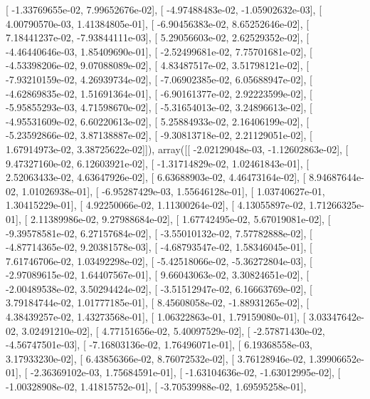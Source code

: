 \documentclass{article}
\begin{document}
       [ -1.33769655e-02,   7.99652676e-02],
       [ -4.97488483e-02,  -1.05902632e-03],
       [  4.00790570e-03,   1.41384805e-01],
       [ -6.90456383e-02,   8.65252646e-02],
       [  7.18441237e-02,  -7.93844111e-03],
       [  5.29056603e-02,   2.62529352e-02],
       [ -4.46440646e-03,   1.85409690e-01],
       [ -2.52499681e-02,   7.75701681e-02],
       [ -4.53398206e-02,   9.07088089e-02],
       [  4.83487517e-02,   3.51798121e-02],
       [ -7.93210159e-02,   4.26939734e-02],
       [ -7.06902385e-02,   6.05688947e-02],
       [ -4.62869835e-02,   1.51691364e-01],
       [ -6.90161377e-02,   2.92223599e-02],
       [ -5.95855293e-03,   4.71598670e-02],
       [ -5.31654013e-02,   3.24896613e-02],
       [ -4.95531609e-02,   6.60220613e-02],
       [  5.25884933e-02,   2.16406199e-02],
       [ -5.23592866e-02,   3.87138887e-02],
       [ -9.30813718e-02,   2.21129051e-02],
       [  1.67914973e-02,   3.38725622e-02]]), array([[ -2.02129048e-03,  -1.12602863e-02],
       [  9.47327160e-02,   6.12603921e-02],
       [ -1.31714829e-02,   1.02461843e-01],
       [  2.52063433e-02,   4.63647926e-02],
       [  6.63688903e-02,   4.46473164e-02],
       [  8.94687644e-02,   1.01026938e-01],
       [ -6.95287429e-03,   1.55646128e-01],
       [  1.03740627e-01,   1.30415229e-01],
       [  4.92250066e-02,   1.11300264e-02],
       [  4.13055897e-02,   1.71266325e-01],
       [  2.11389986e-02,   9.27988684e-02],
       [  1.67742495e-02,   5.67019081e-02],
       [ -9.39578581e-02,   6.27157684e-02],
       [ -3.55010132e-02,   7.57782888e-02],
       [ -4.87714365e-02,   9.20381578e-03],
       [ -4.68793547e-02,   1.58346045e-01],
       [  7.61746706e-02,   1.03492298e-02],
       [ -5.42518066e-02,  -5.36272804e-03],
       [ -2.97089615e-02,   1.64407567e-01],
       [  9.66043063e-02,   3.30824651e-02],
       [ -2.00489538e-02,   3.50294424e-02],
       [ -3.51512947e-02,   6.16663769e-02],
       [  3.79184744e-02,   1.01777185e-01],
       [  8.45608058e-02,  -1.88931265e-02],
       [  4.38439257e-02,   1.43273568e-01],
       [  1.06322863e-01,   1.79159080e-01],
       [  3.03347642e-02,   3.02491210e-02],
       [  4.77151656e-02,   5.40097529e-02],
       [ -2.57871430e-02,  -4.56747501e-03],
       [ -7.16803136e-02,   1.76496071e-01],
       [  6.19368558e-03,   3.17933230e-02],
       [  6.43856366e-02,   8.76072532e-02],
       [  3.76128946e-02,   1.39906652e-01],
       [ -2.36369102e-03,   1.75684591e-01],
       [ -1.63104636e-02,  -1.63012995e-02],
       [ -1.00328908e-02,   1.41815752e-01],
       [ -3.70539988e-02,   1.69595258e-01],
\end{document}
